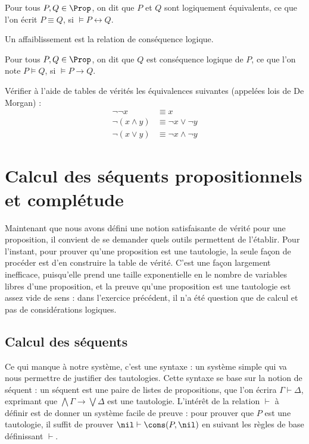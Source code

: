 \begin{definition}
  Pour tous $P,Q\in\Prop$, on dit que $P$ et $Q$ sont logiquement équivalents,
  ce que l'on écrit $P\equiv Q$, si $\models P \leftrightarrow Q$.
\end{definition}

Un affaiblissement est la relation de conséquence logique.

\begin{definition}
  Pour tous $P,Q\in\Prop$, on dit que $Q$ est conséquence logique de $P$, ce que
  l'on note $P\vDash Q$, si $\models P\to Q$.
\end{definition}

\begin{exercise}
  Vérifier à l'aide de tables de vérités les équivalences suivantes (appelées
  lois de De Morgan) :
  \begin{align*}
    \lnot\lnot x &\equiv x\\
    \lnot (x \land y) &\equiv \lnot x \lor \lnot y\\
    \lnot (x \lor y) &\equiv \lnot x \land \lnot y
  \end{align*}
\end{exercise}

\section[Séquents propositionnels]{Calcul des séquents propositionnels et
  complétude}

Maintenant que nous avons défini une notion satisfaisante de vérité pour une
proposition, il convient de se demander quels outils permettent de l'établir.
Pour l'instant, pour prouver qu'une proposition est une tautologie, la seule
façon de procéder est d'en construire la table de vérité. C'est une façon
largement inefficace, puisqu'elle prend une taille exponentielle en le nombre de
variables libres d'une proposition, et la preuve qu'une proposition est une
tautologie est assez vide de sens : dans l'exercice précédent, il n'a été
question que de calcul et pas de considérations logiques.

\subsection{Calcul des séquents}

Ce qui manque à notre système, c'est une syntaxe : un système simple qui va nous
permettre de justifier des tautologies. Cette syntaxe se base sur la notion de
séquent : un séquent est une paire de listes de propositions, que l'on écrira
$\Gamma\vdash \Delta$, exprimant que $\bigwedge \Gamma \to \bigvee \Delta$ est
une tautologie. L'intérêt de la relation $\vdash$ à définir est de donner un
système facile de preuve : pour prouver que $P$ est une tautologie, il suffit
de prouver $\nil\vdash \cons(P,\nil)$ en suivant les règles de base définissant
$\vdash$.

